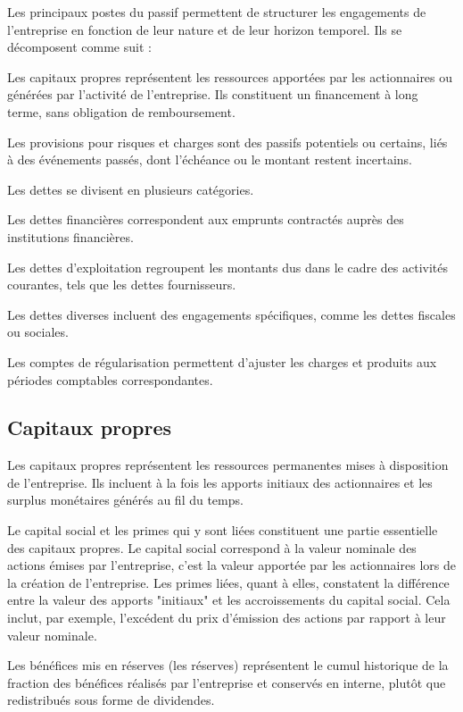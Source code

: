 \documentclass[a4paper, 12pt]{report}
\begin{document}
Les principaux postes du passif permettent de structurer les engagements de l'entreprise en fonction de leur nature et de leur horizon temporel. Ils se décomposent comme suit : 

Les capitaux propres représentent les ressources apportées par les actionnaires ou générées par l'activité de l'entreprise. Ils constituent un financement à long terme, sans obligation de remboursement.

Les provisions pour risques et charges sont des passifs potentiels ou certains, liés à des événements passés, dont l'échéance ou le montant restent incertains.

Les dettes se divisent en plusieurs catégories. 

Les dettes financières correspondent aux emprunts contractés 
auprès des institutions financières. 

Les dettes d'exploitation regroupent les montants dus dans le cadre des activités courantes, tels que les dettes fournisseurs. 

Les dettes diverses incluent des engagements spécifiques, comme les dettes fiscales ou sociales.

Les comptes de régularisation permettent d'ajuster les charges et produits aux périodes comptables correspondantes.

\subsection{Capitaux propres}

Les capitaux propres représentent les ressources permanentes mises à disposition de l'entreprise. Ils incluent à la fois les apports initiaux des actionnaires et les surplus monétaires générés au fil du temps. 

Le capital social et les primes qui y sont liées constituent une partie essentielle des capitaux propres. Le capital social correspond à la valeur nominale des actions émises par l'entreprise, c'est la valeur apportée par les actionnaires lors de la création de l'entreprise. Les primes liées, quant à elles, constatent la différence entre la valeur des apports "initiaux" et les accroissements du capital social. Cela inclut, par exemple, l'excédent du prix d'émission des actions par rapport à leur valeur nominale.

Les bénéfices mis en réserves (les réserves) représentent le cumul historique de la fraction des bénéfices réalisés par l'entreprise et conservés en interne, plutôt que redistribués sous forme de dividendes.
\end{document}

